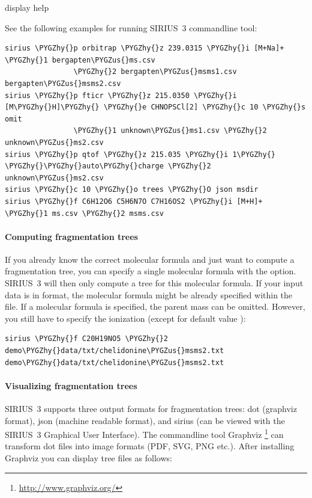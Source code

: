 \documentclass[letterpaper,10pt,openany,oneside]{sphinxmanual}
\def\PYGZus{\char`\_}
\def\PYGZhy{\char`\-}
\begin{document}
\begin{fulllineitems}
\label{commandline:cmdoption-h}
display help

\end{fulllineitems}


See the following examples for running SIRIUS~3 commandline tool:

\begin{Verbatim}[commandchars=\\\{\}]
sirius \PYGZhy{}p orbitrap \PYGZhy{}z 239.0315 \PYGZhy{}i [M+Na]+ \PYGZhy{}1 bergapten\PYGZus{}ms.csv
                \PYGZhy{}2 bergapten\PYGZus{}msms1.csv bergapten\PYGZus{}msms2.csv
sirius \PYGZhy{}p fticr \PYGZhy{}z 215.0350 \PYGZhy{}i [M\PYGZhy{}H]\PYGZhy{} \PYGZhy{}e CHNOPSCl[2] \PYGZhy{}c 10 \PYGZhy{}s omit
                \PYGZhy{}1 unknown\PYGZus{}ms1.csv \PYGZhy{}2 unknown\PYGZus{}ms2.csv
sirius \PYGZhy{}p qtof \PYGZhy{}z 215.035 \PYGZhy{}i 1\PYGZhy{} \PYGZhy{}\PYGZhy{}auto\PYGZhy{}charge \PYGZhy{}2 unknown\PYGZus{}ms2.csv
sirius \PYGZhy{}c 10 \PYGZhy{}o trees \PYGZhy{}O json msdir
sirius \PYGZhy{}f C6H12O6 C5H6N7O C7H16OS2 \PYGZhy{}i [M+H]+ \PYGZhy{}1 ms.csv \PYGZhy{}2 msms.csv
\end{Verbatim}


\paragraph{Computing fragmentation trees}
\label{commandline:computing-fragmentation-trees}
If you already know the correct molecular formula and just want to compute a
fragmentation tree, you can specify a single molecular formula with
the  option. SIRIUS~3 will then only compute a tree for this
molecular formula. If your input data is in  format, the molecular
formula might be already specified within the file. If a molecular formula is
specified, the parent mass can be omitted. However, you still have to specify
the ionization (except for default value \code{{[}M+H{]}+}):

\begin{Verbatim}[commandchars=\\\{\}]
sirius \PYGZhy{}f C20H19NO5 \PYGZhy{}2 demo\PYGZhy{}data/txt/chelidonine\PYGZus{}msms2.txt demo\PYGZhy{}data/txt/chelidonine\PYGZus{}msms2.txt
\end{Verbatim}


\paragraph{Visualizing fragmentation trees}
\label{commandline:visualizing-fragmentation-trees}
SIRIUS~3 supports three output formats for fragmentation trees: dot (graphviz format), json (machine readable format), and sirius (can be viewed with the SIRIUS~3 Graphical User Interface). The commandline tool Graphviz \footnote{\sphinxAtStartFootnote%
\url{http://www.graphviz.org/}
} can transform dot files into image formats (PDF, SVG, PNG etc.). After installing Graphviz you can display tree files as follows:
\end{document}

